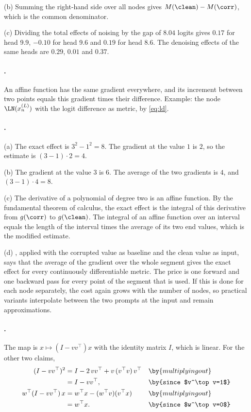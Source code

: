 {(b) Summing the right-hand side over all nodes gives $M(\clean)-M(\corr)$, which is the common denominator.

(c) Dividing the total effects of noising by the gap of $8.04$ logits gives $0.17$ for head 9.9, $-0.10$ for head
9.6 and $0.19$ for head 8.6. The denoising effects of the same heads are $0.29$, $0.01$ and $0.37$.

\paragraph{.}
An affine function has the same gradient everywhere, and its increment between two points equals this gradient
times their difference. Example: the node $\LN(x_n^{(L)})$ with the logit difference as metric, by \eqref{eq:ld}.

\paragraph{.}
(a) The exact effect is $3^2-1^2=8$. The gradient at the value $1$ is $2$, so the estimate is $(3-1)\cdot2=4$.

(b) The gradient at the value $3$ is $6$. The average of the two gradients is $4$, and $(3-1)\cdot4=8$.

(c) The derivative of a polynomial of degree two is an affine function. By the fundamental theorem of calculus,
the exact effect is the integral of this derivative from $g(\corr)$ to $g(\clean)$. The integral of an affine
function over an interval equals the length of the interval times the average of its two end values, which is
the modified estimate.

(d) , applied with the corrupted value as baseline and the clean value as input, says that the
average of the gradient over the whole segment gives the exact effect for every continuously differentiable
metric. The price is one forward and one backward pass for every point of the segment that is used. If this is
done for each node separately, the cost again grows with the number of nodes, so practical variants interpolate
between the two prompts at the input and remain approximations.

\paragraph{.}
The map is $x\mapsto(I-vv^\top)x$ with the identity matrix $I$, which is linear. For the other two claims,
\begin{align*}
(I-vv^\top)^2 &= I-2\,vv^\top+v\,(v^\top v)\,v^\top && \by{multiplying out}\\
&= I-vv^\top, && \by{since $v^\top v=1$}\\
w^\top(I-vv^\top)\,x &= w^\top x-(w^\top v)(v^\top x) && \by{multiplying out}\\
&= w^\top x. && \by{since $w^\top v=0$}
\end{align*}

}
